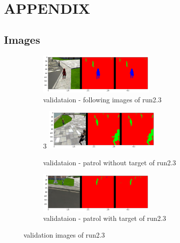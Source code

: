 \documentclass[paper=a4, fontsize=11pt]{scrartcl} %
\numberwithin{equation}{section} %
\numberwithin{figure}{section} %
\numberwithin{table}{section} %
\begin{document}
\newpage
\section{APPENDIX}

\subsection{Images}

\begin{figure}[ht]
	\begin{subfigure}{0.33\textwidth}
	\includegraphics[width=0.9\linewidth, height=2cm]{./imgs/following_images23.png} 
	\caption{validataion - following images of run2.3}
	\label{fig:subfollowing_images23}
	\end{subfigure}
	\begin{subfigure}{0.33\textwidth}3
	\includegraphics[width=0.9\linewidth, height=2cm]{./imgs/patrol_non_targ23.png}
	\caption{validataion - patrol without target of run2.3}
	\label{fig:subpatrol_non_targ23}
	\end{subfigure}
	\begin{subfigure}{0.33\textwidth}
	\includegraphics[width=0.9\linewidth, height=2cm]{./imgs/patrol_with_targ23.png}
	\caption{validataion - patrol with target of run2.3}
	\label{fig:subpatrol_with_targ23}
	\end{subfigure}

	\caption{validation images of run2.3}
	\label{fig:outputimages23}
\end{figure}
\end{document}
